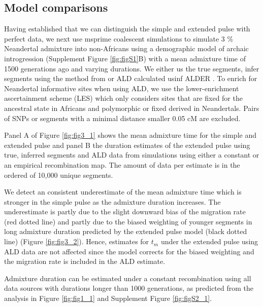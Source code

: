 \documentclass[11pt]{article}
\begin{document}
\subsection{Model comparisons}\label{Model comparison}

Having established that we can distinguish the simple and extended pulse with perfect data, we next use msprime coalescent simulations to simulate 3 \% Neandertal admixture into non-Africans using a demographic model of archaic introgression (Supplement Figure \ref{fig:figS1}B) with a mean admixture time of 1500 generations ago and varying durations. We either us the true segments, infer segments using the method from \cite{skov_detecting_2018} or ALD calculated usinf ALDER \citep{loh_inferring_2013}. To enrich for Neandertal informative sites when using ALD, we use the lower-enrichment ascertainment scheme (LES)  which only considers sites that are fixed for the ancestral state in Africans and polymorphic or fixed derived in Neandertals. Pairs of SNPs or segments with a minimal distance smaller 0.05 cM are excluded.

Panel A of Figure \ref{fig:fig3_1} shows the mean admixture time for the simple and extended pulse and panel B the duration estimates of the extended pulse using true, inferred segments and ALD data from simulations using either a constant or an empirical recombination map.
The amount of data per estimate is in the ordered of 10,000 unique segments. 

We detect an consistent underestimate of the mean admixture time which is stronger in the simple pulse as the admixture duration increases. The underestimate is partly due to the slight downward bias of the migration rate (red dotted line) and partly due to the biased weighting of younger segments in long admixture duration predicted by the extended pulse model (black dotted line) (Figure \ref{fig:fig3_2}). Hence, estimates for $t_m$ under the extended pulse using ALD data are not affected since the model corrects for the biased weighting and the  migration rate is included in the ALD estimate.

Admixture duration can be estimated under a constant recombination using all data sources with durations longer than 1000 generations, as predicted from the analysis in Figure \ref{fig:fig1_1} and Supplement Figure \ref{fig:figS2_1}.
\end{document}
